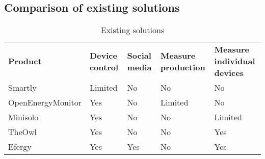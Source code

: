 \subsection{Comparison of existing solutions}
\begin{table}[H]
\centering
{}
\begin{tabular}{|l|l|p{3cm}|p{}|p{3cm}|}
\hline
\textbf{Product} & \textbf{Device control} & \textbf{Social media} & \textbf{Measure production} & \textbf{Measure individual devices} \\
Smartly & Limited & No  & No & No\\
OpenEnergyMonitor & Yes & No  & Limited & No \\
Minisolo & Yes & No  & No & Limited\\
TheOwl & Yes & No & No & Yes\\
Efergy & Yes & Yes &  No & Yes\\\hline
\end{tabular}
\caption{Existing solutions}
\label{tab:existingSolutions}
\end{table}
